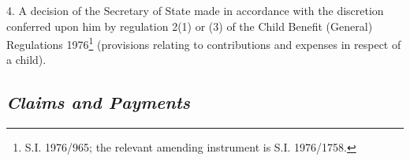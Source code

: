 \documentclass[12pt,a4paper]{article}
\begin{document}
\medskip

4.  A decision of the Secretary of State made in accordance with the discretion conferred upon him by regulation 2(1) or (3) of the Child Benefit (General) Regulations 1976\footnote{\frenchspacing S.I. 1976/965; the relevant amending instrument is S.I. 1976/1758.} (provisions relating to contributions and expenses in respect of a child).

\subsection*{\itshape Claims and Payments}

%
%
%
%
%
%
%
%
%
%
%
\end{document}
